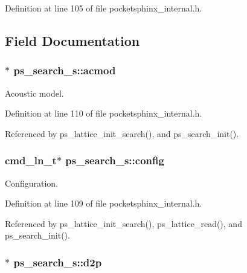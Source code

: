 Definition at line 105 of file pocketsphinx\-\_\-internal.\-h.



\subsection{Field Documentation}
\subsubsection[{acmod}]{$\ast$ ps\-\_\-search\-\_\-s\-::acmod}\label{structps__search__s_a0fdf6fe8c4d9c28f10c48c09517c6b91}


Acoustic model. 



Definition at line 110 of file pocketsphinx\-\_\-internal.\-h.



Referenced by ps\-\_\-lattice\-\_\-init\-\_\-search(), and ps\-\_\-search\-\_\-init().

\subsubsection[{config}]{\setlength{\rightskip}{0pt plus 5cm}cmd\-\_\-ln\-\_\-t$\ast$ ps\-\_\-search\-\_\-s\-::config}\label{structps__search__s_aa6e3e18165bbc70084a06575d5703042}


Configuration. 



Definition at line 109 of file pocketsphinx\-\_\-internal.\-h.



Referenced by ps\-\_\-lattice\-\_\-init\-\_\-search(), ps\-\_\-lattice\-\_\-read(), and ps\-\_\-search\-\_\-init().

\subsubsection[{d2p}]{$\ast$ ps\-\_\-search\-\_\-s\-::d2p}\label{structps__search__s_a81b461e7ef3a080d046039e186134a15}


